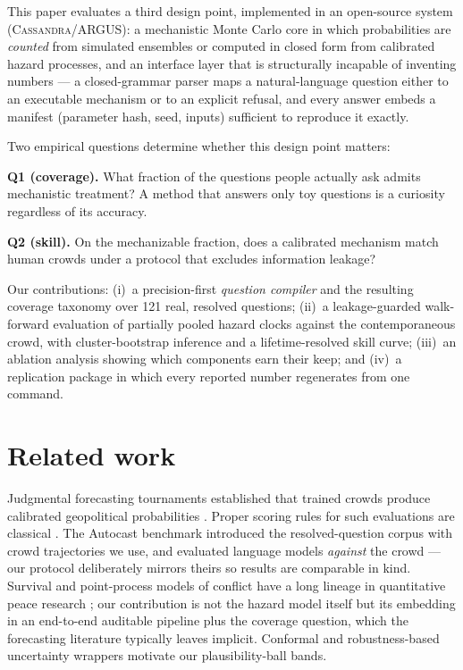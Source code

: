 \documentclass[11pt]{article}
\begin{document}
This paper evaluates a third design point, implemented in an open-source
system (\textsc{Cassandra}/ARGUS): a mechanistic Monte Carlo core in which
probabilities are \emph{counted} from simulated ensembles or computed in
closed form from calibrated hazard processes, and an interface layer that is
structurally incapable of inventing numbers --- a closed-grammar parser maps a
natural-language question either to an executable mechanism or to an explicit
refusal, and every answer embeds a manifest (parameter hash, seed, inputs)
sufficient to reproduce it exactly.

Two empirical questions determine whether this design point matters:

\textbf{Q1 (coverage).} What fraction of the questions people actually ask
admits mechanistic treatment? A method that answers only toy questions is a
curiosity regardless of its accuracy.

\textbf{Q2 (skill).} On the mechanizable fraction, does a calibrated
mechanism match human crowds under a protocol that excludes information
leakage?

Our contributions: (i)~a precision-first \emph{question compiler} and the
resulting coverage taxonomy over 121 real, resolved questions; (ii)~a
leakage-guarded walk-forward evaluation of partially pooled hazard clocks
against the contemporaneous crowd, with cluster-bootstrap inference and a
lifetime-resolved skill curve; (iii)~an ablation analysis showing which
components earn their keep; and (iv)~a replication package in which every
reported number regenerates from one command.

\section{Related work}
Judgmental forecasting tournaments established that trained crowds produce
calibrated geopolitical probabilities \citep{tetlock2015, mellers2014}.
Proper scoring rules for such evaluations are classical
\citep{brier1950, gneiting2007}. The Autocast benchmark \citep{zou2022}
introduced the resolved-question corpus with crowd trajectories we use, and
evaluated language models \emph{against} the crowd --- our protocol
deliberately mirrors theirs so results are comparable in kind. Survival and
point-process models of conflict have a long lineage in quantitative peace
research \citep{ward2010}; our contribution is not the hazard model itself but
its embedding in an end-to-end auditable pipeline plus the coverage question,
which the forecasting literature typically leaves implicit. Conformal and
robustness-based uncertainty wrappers \citep{vovk2005} motivate our
plausibility-ball bands.
\end{document}
